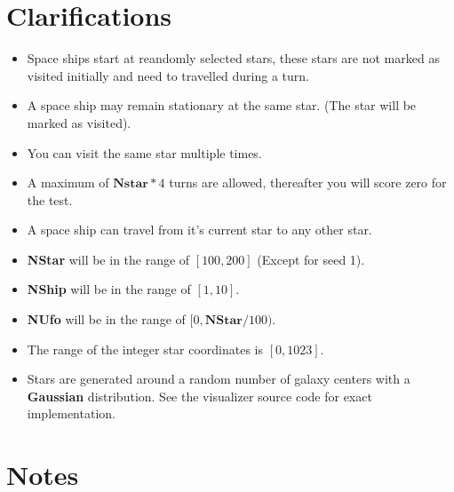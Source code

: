 \documentclass[hyperref,UTF8]{ctexart}
\theoremstyle{definition}
\theoremstyle{remark}
\numberwithin{equation}{subsection}
\newcommand{\Emph}{\textbf}
\begin{document}
	
\section{Clarifications}
\label{sec:clarifications}
	
	\begin{itemize}
	
		\item Space ships start at reandomly selected stars, these stars are not marked as visited
		initially and need to travelled during a turn.
		
		\item A space ship may remain stationary at the same star. (The star will be marked as visited).
		
		\item You can visit the same star multiple times.
		
		\item A maximum of $\Emph{Nstar}*4$ turns are allowed, thereafter you will score zero for the test.
		
		\item A space ship can travel from it's current star to any other star.
		
		\item \Emph{NStar} will be in the range of $[100, 200]$ (Except for seed 1).
		
		\item \Emph{NShip} will be in the range of $[1, 10]$.
		
		\item \Emph{NUfo} will be in the range of $[0, \Emph{NStar}/100)$.
		
		\item The range of the integer star coordinates is $[0, 1023]$.
		
		\item Stars are generated around a random number of galaxy centers with a \Emph{Gaussian} distribution.
		See the visualizer source code for exact implementation.
	
	\end{itemize}
	
\section{Notes}	
\label{sec:notes}
\end{document}
